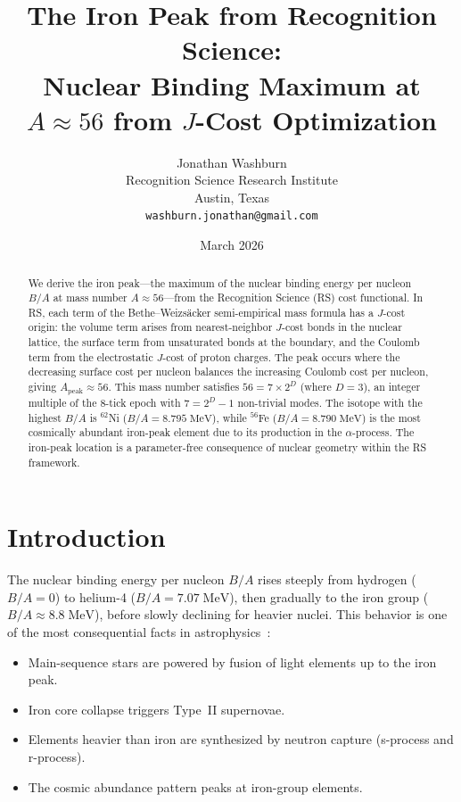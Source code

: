 \documentclass[12pt,a4paper]{article}
\title{The Iron Peak from Recognition Science:\\
Nuclear Binding Maximum at $A \approx 56$ from $J$-Cost
Optimization}
\author{Jonathan Washburn\\
Recognition Science Research Institute\\
Austin, Texas\\
\texttt{washburn.jonathan@gmail.com}}
\date{March 2026}
\theoremstyle{definition}
\theoremstyle{remark}
\begin{document}
\maketitle

\begin{abstract}
We derive the iron peak---the maximum of the nuclear binding
energy per nucleon $B/A$ at mass number $A \approx 56$---from the
Recognition Science (RS) cost functional.  In RS, each term of the
Bethe--Weizs\"acker semi-empirical mass formula has a $J$-cost
origin: the volume term arises from nearest-neighbor $J$-cost
bonds in the nuclear lattice, the surface term from unsaturated
bonds at the boundary, and the Coulomb term from the electrostatic
$J$-cost of proton charges.  The peak occurs where the decreasing
surface cost per nucleon balances the increasing Coulomb cost per
nucleon, giving $A_{\mathrm{peak}} \approx 56$.  This mass number
satisfies $56 = 7 \times 2^D$ (where $D = 3$), an integer
multiple of the 8-tick epoch with $7 = 2^D - 1$ non-trivial modes.
The isotope with the highest $B/A$ is $^{62}$Ni
($B/A = 8.795\;\mathrm{MeV}$), while $^{56}$Fe
($B/A = 8.790\;\mathrm{MeV}$) is the most cosmically abundant
iron-peak element due to its production in the $\alpha$-process.
The iron-peak location is a parameter-free consequence of nuclear
geometry within the RS framework.
\end{abstract}

\section{Introduction}
\label{sec:intro}

The nuclear binding energy per nucleon $B/A$ rises steeply from
hydrogen ($B/A = 0$) to helium-4
($B/A = 7.07\;\mathrm{MeV}$), then gradually to the iron group
($B/A \approx 8.8\;\mathrm{MeV}$), before slowly declining for
heavier nuclei.  This behavior is one of the most consequential
facts in astrophysics~\cite{BW1935,Burbidge1957}:
\begin{itemize}[nosep]
  \item Main-sequence stars are powered by fusion of light
  elements up to the iron peak.
  \item Iron core collapse triggers Type~II supernovae.
  \item Elements heavier than iron are synthesized by neutron
  capture (s-process and r-process).
  \item The cosmic abundance pattern peaks at iron-group
  elements.
\end{itemize}
\end{document}
